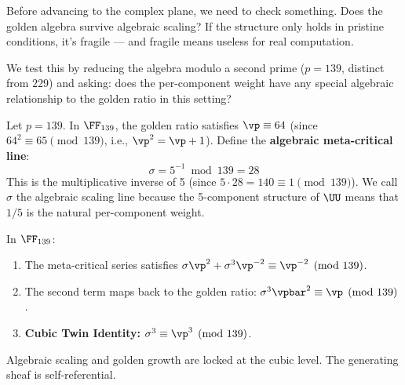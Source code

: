 Before advancing to the complex plane, we need to check something. Does the golden algebra survive algebraic scaling? If the structure only holds in pristine conditions, it's fragile --- and fragile means useless for real computation.

We test this by reducing the algebra modulo a second prime ($p = 139$, distinct from $229$) and asking: does the per-component weight have any special algebraic relationship to the golden ratio in this setting?

\begin{definition}\label{def:sigma}
Let $p = 139$. In $\FF_{139}$, the golden ratio satisfies $\vp \equiv 64$ (since $64^2 \equiv 65 \pmod{139}$, i.e., $\vp^2 = \vp + 1$). Define the \textbf{algebraic meta-critical line}:
$$\sigma = 5^{-1} \bmod{139} = 28$$
This is the multiplicative inverse of 5 (since $5 \cdot 28 = 140 \equiv 1 \pmod{139}$). We call $\sigma$ the algebraic scaling line because the 5-component structure of $\UU$ means that $1/5$ is the natural per-component weight.
\end{definition}

\begin{theorem}\label{thm:metacritical}
In $\FF_{139}$:
\begin{enumerate}
\item The meta-critical series satisfies $\sigma \vp^2 + \sigma^3 \vp^{-2} \equiv \vp^{-2} \pmod{139}$.
\item The second term maps back to the golden ratio: $\sigma^3 \vpbar^2 \equiv \vp \pmod{139}$.
\item \textbf{Cubic Twin Identity:} $\sigma^3 \equiv \vp^3 \pmod{139}$.
\end{enumerate}
Algebraic scaling and golden growth are locked at the cubic level. The generating sheaf is self-referential.
\end{theorem}

